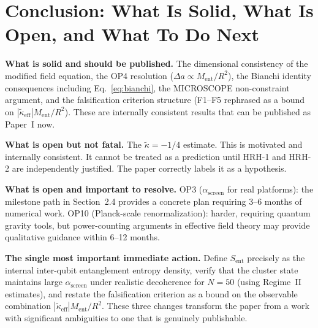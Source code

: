 \documentclass[12pt,letterpaper]{article}
\theoremstyle{plain}
\theoremstyle{definition}
\theoremstyle{remark}
\newcommand{\kt}{\tilde{\kappa}}
\newcommand{\kteff}{\tilde{\kappa}_{\mathrm{eff}}}
\newcommand{\Sent}{S_{\mathrm{ent}}}
\newcommand{\Ment}{M_{\mathrm{ent}}}
\newcommand{\asc}{\alpha_{\mathrm{screen}}}
\begin{document}
\section*{Conclusion: What Is Solid, What Is Open, and What To Do Next}

\textbf{What is solid and should be published.}
The dimensional consistency of the modified field equation, the OP4 resolution
($\Delta a \propto \Ment/R^2$), the Bianchi identity consequences including
Eq.~\eqref{eq:bianchi}, the MICROSCOPE non-constraint argument, and the falsification
criterion structure (F1--F5 rephrased as a bound on $|\kteff|\Ment/R^2$).
These are internally consistent results that can be published as Paper~I now.

\textbf{What is open but not fatal.}
The $\kt = -1/4$ estimate.  This is motivated and internally consistent.  It cannot be
treated as a prediction until HRH-1 and HRH-2 are independently justified.  The paper
correctly labels it as a hypothesis.

\textbf{What is open and important to resolve.}
OP3 ($\asc$ for real platforms): the milestone path in Section~2.4 provides a concrete
plan requiring 3--6 months of numerical work.  OP10 (Planck-scale renormalization): harder,
requiring quantum gravity tools, but power-counting arguments in effective field theory may
provide qualitative guidance within 6--12 months.

\textbf{The single most important immediate action.}
Define $\Sent$ precisely as the internal inter-qubit entanglement entropy density, verify
that the cluster state maintains large $\asc$ under realistic decoherence for $N = 50$
(using Regime~II estimates), and restate the falsification criterion as a bound on the
observable combination $|\kteff|\Ment/R^2$.  These three changes transform the paper
from a work with significant ambiguities to one that is genuinely publishable.
\end{document}
